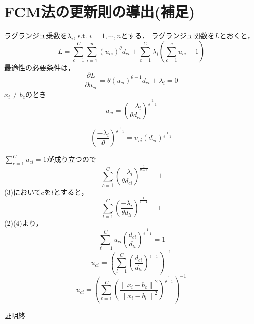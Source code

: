 \documentclass[uplatex,dvipdfmx,10pt]{beamer}
\begin{document}
\section{FCM法の更新則の導出(補足)}
\begin{frame}

ラグランジュ乗数を$\lambda_{i}$, s.t. $i=1, \cdots, n$とする．
ラグランジュ関数を$L$とおくと，
\[
L=\sum_{c=1}^{C} \sum_{i=1}^{n}\left(u_{c i}\right)^{\theta} d_{c i}+\sum_{c=1}^{C} \lambda_{i}\left(\sum_{c=1}^{c} u_{c i}-1\right)
\]
最適性の必要条件は，
\[
\frac{\partial L}{\partial u_{c i}}=\theta\left(u_{c i}\right)^{\theta-1} d_{ci}+\lambda_{i}=0
\]
$x_i\ne b_c$のとき
\begin{equation}
u _{c i}=\left(\frac{-\lambda_{i}}{\theta d_{c i}}\right)^{\frac{1}{\theta-1}}
\end{equation}

\begin{equation}
\left(\frac{-\lambda_i}{ \theta}\right)^{\frac{1}{\theta-1}}=u_{c i}(d_{ci})^{\frac{1}{\theta-1}}
\end{equation}

\end{frame}
\begin{frame}

$\sum_{c=1}^{C} u_{c i}=1$が成り立つので
\begin{equation}
\sum_{c=1}^{C}\left(\frac{-\lambda_{i}}{\theta d _{c i}}\right)^{\frac{1}{\theta-1}}=1
\end{equation}
(3)において$c$を$l$とすると，
\begin{equation}
\sum_{l=1}^{C}\left(\frac{-\lambda_{i}}{\theta d_{l i}}\right)^{\frac{1}{\theta-1}}=1
\end{equation}
(2)(4)より，
\[
\sum_{\ell=1}^{C} u_{c i}\left(\frac{d_{c i}}{d _{l i}}\right)^{\frac{1}{\theta-1}}=1
\]
\[
u_{c i}=\left(\sum_{l=1}^{C}\left(\frac{d_{c i}}{d _{li}}\right)^{\frac{1}{\theta-1}}\right)^{-1}
\]
\begin{equation}
u_{ci}=\left(\sum_{l=1}^{C}\left(\frac{\left\|x_{i}-b_{c}\right\|^{2}}{\left\|x_{i}-b_{l}\right\|^{2}}\right)^{\frac{1}{\theta - 1}}\right)^{-1}
\end{equation}
\begin{flushright}
  証明終
\end{flushright}
\end{frame}
\end{document}
